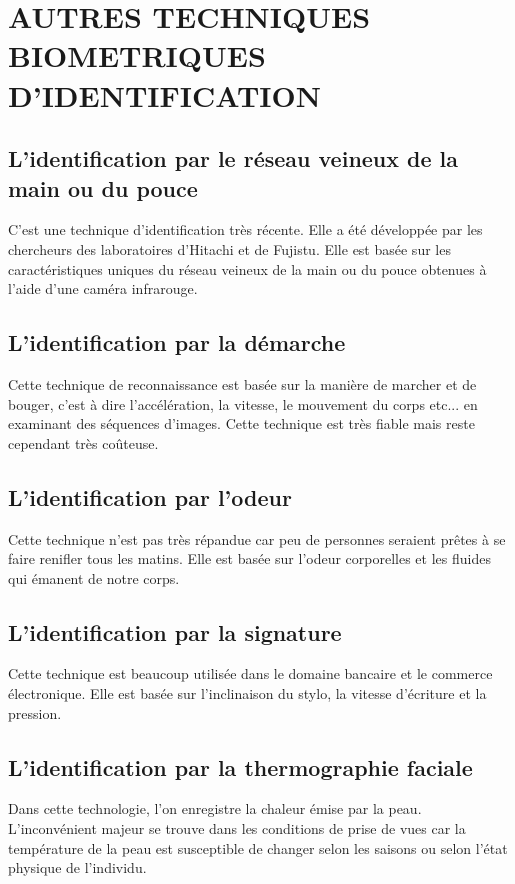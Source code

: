 \documentclass[overfullbox]{polytech/polytech}
\begin{document}
\section{AUTRES TECHNIQUES BIOMETRIQUES D'IDENTIFICATION}

\subsection{L'identification par le réseau veineux de la main ou du pouce}
C'est une technique d'identification très récente. Elle a été développée par les chercheurs des laboratoires d'Hitachi et de Fujistu. Elle est basée sur les caractéristiques uniques du réseau veineux de la main ou du pouce obtenues à l'aide d'une caméra infrarouge.

\subsection{L'identification par la démarche}
Cette technique de reconnaissance est basée sur la manière de marcher et de bouger, c'est à dire l'accélération, la vitesse, le mouvement du corps etc... en examinant des séquences d'images. Cette technique est très fiable mais reste cependant très coûteuse.

\subsection{L'identification par l'odeur} 
Cette technique n'est pas très répandue car peu de personnes seraient prêtes à se faire renifler tous les matins. Elle est basée sur l'odeur corporelles et les fluides qui émanent de notre corps.

\subsection{L'identification par la signature}
 Cette technique est beaucoup utilisée dans le domaine bancaire et le commerce électronique. Elle est basée sur l'inclinaison du stylo, la vitesse d'écriture et la pression.


\subsection{L'identification par la thermographie faciale}
Dans cette technologie, l'on enregistre la chaleur émise par la peau. L'inconvénient majeur se trouve dans les conditions de prise de vues car la température de la peau est susceptible de changer selon les saisons ou selon l'état physique de l'individu.
\end{document}
